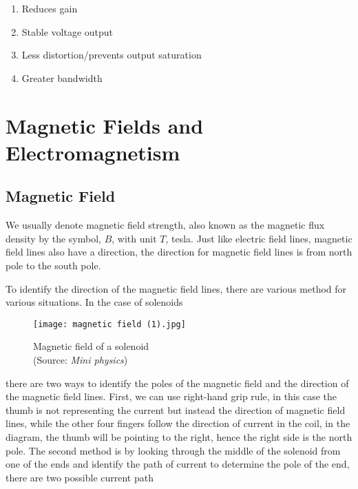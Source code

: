 \documentclass{article}
\begin{document}
 
 
\begin{tcolorbox}[colframe=black!20!white,title=\textcolor{red}{Effects of negative feedback}]
 
 \begin{enumerate}
 \color{red}
     \item Reduces gain
     \item Stable voltage output
     \item Less distortion/prevents output saturation
     \item Greater bandwidth
 \end{enumerate}
 \end{tcolorbox}
 
\newpage
\section{Magnetic Fields and Electromagnetism}

 \subsection{Magnetic Field}


We usually denote magnetic field strength, also known as the magnetic flux density by the symbol, $B$, with unit $T$, tesla. Just like electric field lines, magnetic field lines also have a direction, the direction for magnetic field lines is from north pole to the south pole.

To identify the direction of the magnetic field lines, there are various method for various situations. In the case of solenoids

\begin{figure}[H]
    \centering
    \captionsetup{justification=centering,margin=2cm}
    \texttt{[image: magnetic field (1).jpg]}
    \caption*{Magnetic field of a solenoid \\ (Source: \textit{Mini physics})}
\end{figure}
there are two ways to identify the poles of the magnetic field and the direction of the magnetic field lines. First, we can use right-hand grip rule, in this case the thumb is not representing the current but instead the direction of magnetic field lines, while the other four fingers follow the direction of current in the coil, in the diagram, the thumb will be pointing to the right, hence the right side is the north pole. The second method is by looking through the middle of the solenoid from one of the ends and identify the path of current to determine the pole of the end, there are two possible current path 
\end{document}
